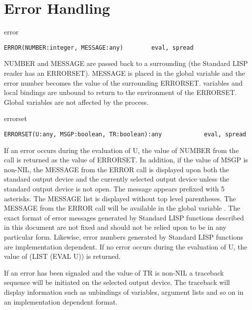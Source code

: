 \section{Error Handling}

\begin{Function}{error}
\begin{verbatim}
ERROR(NUMBER:integer, MESSAGE:any)        eval, spread
\end{verbatim}
   NUMBER  and MESSAGE are passed  back to a surrounding 
   (the  Standard LISP reader has an ERRORSET). MESSAGE is placed
   in  the global  variable   and the  error number becomes
   the  value of  the surrounding  ERRORSET.   variables and
   local  bindings  are  unbound  to  return  to  the environment
   of  the  ERRORSET. Global  variables are  not affected  by the
   process.

\end{Function}
\begin{Function}{errorset}
\begin{verbatim}
ERRORSET(U:any, MSGP:boolean, TR:boolean):any            eval, spread
\end{verbatim}
   If  an  error occurs  during the  evaluation  of U,  the value
   of  NUMBER from  the   call is  returned as the  value of
   ERRORSET.  In  addition,  if  the value  of  MSGP  is non-NIL,
   the  MESSAGE from  the ERROR call  is displayed  upon both the
   standard  output  device  and  the  currently  selected output
   device  unless the  standard output device  is not open.   The
   message  appears prefixed with 5 asterisks.   The MESSAGE list
   is  displayed  without top  level  parentheses.    The MESSAGE
   from  the ERROR call will be  available in the global variable
   .    The  exact format  of  error messages  generated by
   Standard  LISP functions  described in  this document  are not
   fixed  and should not  be relied upon to  be in any particular
   form.    Likewise,  error numbers  generated by  Standard LISP
   functions are implementation dependent.
   If  no error occurs  during the evaluation of  U, the value of
   (LIST (EVAL U)) is returned.

   If  an error has been signaled and  the value of TR is non-NIL
   a  traceback sequence will be initiated on the selected output
   device.     The  traceback will  display  information  such as
   unbindings  of  variables, argument lists and so on in an
   implementation dependent format.

\end{Function}

